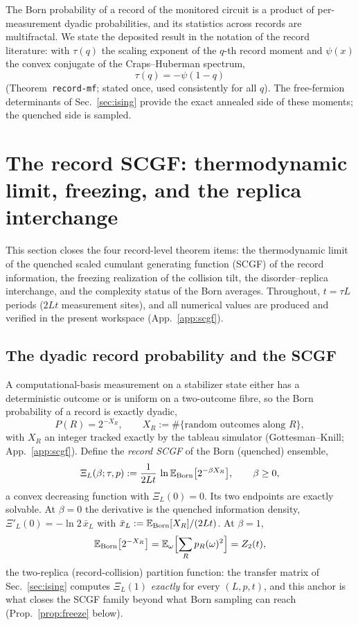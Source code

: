 \documentclass[11pt]{article}
\newcommand{\E}{\mathbb{E}}
\begin{document}
The Born probability of a record of the monitored circuit is a product of
per-measurement dyadic probabilities, and its statistics across records are
multifractal.  We state the deposited result in the notation of the record
literature: with $\tau(q)$ the scaling exponent of the $q$-th record moment
and $\psi(x)$ the convex conjugate of the Craps--Huberman spectrum,
\begin{equation}
  \tau(q)=-\psi(1-q)
  \label{eq:taupsi}
\end{equation}
(Theorem~\texttt{record-mf}; stated once, used consistently for all $q$).
The free-fermion determinants of Sec.~\ref{sec:ising} provide the exact
annealed side of these moments; the quenched side is sampled.

\section{The record SCGF: thermodynamic limit, freezing, and the replica
interchange}\label{sec:scgf}

This section closes the four record-level theorem items: the thermodynamic
limit of the quenched scaled cumulant generating function (SCGF) of the
record information, the freezing realization of the collision tilt, the
disorder--replica interchange, and the complexity status of the Born
averages.  Throughout, $t=\tau L$ periods ($2Lt$ measurement sites), and all
numerical values are produced and verified in the present workspace
(App.~\ref{app:scgf}).

\subsection{The dyadic record probability and the SCGF}

A computational-basis measurement on a stabilizer state either has a
deterministic outcome or is uniform on a two-outcome fibre, so the Born
probability of a record is exactly dyadic,
\begin{equation}
  P(R)=2^{-X_R},\qquad
  X_R:=\#\{\text{random outcomes along }R\},
  \label{eq:dyadic}
\end{equation}
with $X_R$ an integer tracked exactly by the tableau simulator
(Gottesman--Knill; App.~\ref{app:scgf}).  Define the \emph{record SCGF} of
the Born (quenched) ensemble,
\begin{equation}
  \Xi_L(\beta;\tau,p):=\frac{1}{2Lt}\,
    \ln\E_{\rm Born}\bigl[2^{-\beta X_R}\bigr],
  \qquad \beta\ge0,
  \label{eq:scgfdef}
\end{equation}
a convex decreasing function with $\Xi_L(0)=0$.  Its two endpoints are
exactly solvable.  At $\beta=0$ the derivative is the quenched information
density, $\Xi'_L(0)=-\ln2\,\bar x_L$ with
$\bar x_L:=\E_{\rm Born}[X_R]/(2Lt)$.  At $\beta=1$,
\begin{equation}
  \E_{\rm Born}\bigl[2^{-X_R}\bigr]
    =\E_\omega\Bigl[\sum_R p_R(\omega)^2\Bigr]=Z_2(t),
  \label{eq:beta1exact}
\end{equation}
the two-replica (record-collision) partition function: the transfer matrix
of Sec.~\ref{sec:ising} computes $\Xi_L(1)$ \emph{exactly} for every
$(L,p,t)$, and this anchor is what closes the SCGF family beyond what
Born sampling can reach (Prop.~\ref{prop:freeze} below).
\end{document}
